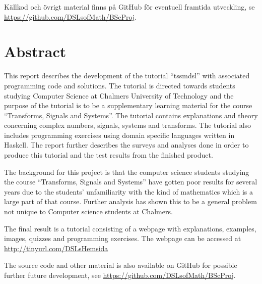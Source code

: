 \documentclass[12pt,a4paper,twoside,openright]{article}
\begin{document}
Källkod och övrigt material finns på GitHub för eventuell framtida utveckling, se
\url{https://github.com/DSLsofMath/BScProj}.

\newpage

\thispagestyle{plain}

\section*{Abstract}

This report describes the development of the tutorial ``\gls{tssmdsl}''
with associated programming code and solutions. The tutorial is
directed towards students studying Computer Science at Chalmers
University of Technology and the purpose of the tutorial is to be a
supplementary learning material for the course ``Transforms, Signals
and Systems''. The tutorial contains explanations and theory
concerning complex numbers, signals, systems and transforms. The
tutorial also includes programming exercises using domain specific
languages written in Haskell. The report further describes the surveys and analyses done in order to
produce this tutorial and the test results from the finished product.

The background for this project is that the computer science students
studying the course ``Transforms, Signals and Systems'' have gotten
poor results for several years due to the students' unfamiliarity with
the kind of mathematics which is a large part of that course. Further
analysis has shown this to be a general problem not unique to Computer
science students at Chalmers.

The final result is a tutorial consisting of a webpage with
explanations, examples, images, quizzes and programming
exercises. The webpage can be accessed at \\
\url{http://tinyurl.com/DSLsHemsida}

The source code and other material is also available on GitHub for
possible further future development, see
\url{https://github.com/DSLsofMath/BScProj}.

\newpage

\tableofcontents

\newpage

\setlength{\parskip}{1mm}
\printglossaries

\newpage

\setcounter{page}{1}
\setlength{\parskip}{2mm plus2mm}
\end{document}
